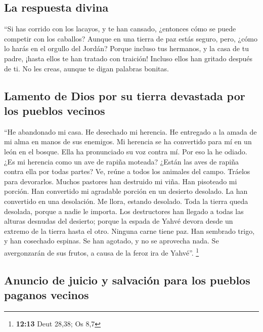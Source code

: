 \begin{paracol}{2}
\hypertarget{la-respuesta-divina}{%
\subsection{La respuesta divina}\label{la-respuesta-divina}}

 ``Si has corrido con los lacayos, y te han cansado,
¿entonces cómo se puede competir con los caballos? Aunque en una tierra
de paz estás seguro, pero, ¿cómo lo harás en el orgullo del Jordán?
 Porque incluso tus hermanos, y la casa de tu padre,
¡hasta ellos te han tratado con traición! Incluso ellos han gritado
después de ti. No les creas, aunque te digan palabras bonitas.

\hypertarget{lamento-de-dios-por-su-tierra-devastada-por-los-pueblos-vecinos}{%
\subsection{Lamento de Dios por su tierra devastada por los pueblos
vecinos}\label{lamento-de-dios-por-su-tierra-devastada-por-los-pueblos-vecinos}}

 ``He abandonado mi casa. He desechado mi herencia. He
entregado a la amada de mi alma en manos de sus enemigos. 
Mi herencia se ha convertido para mí en un león en el bosque. Ella ha
pronunciado su voz contra mí. Por eso la he odiado.  ¿Es
mi herencia como un ave de rapiña moteada? ¿Están las aves de rapiña
contra ella por todas partes? Ve, reúne a todos los animales del campo.
Tráelos para devorarlos.  Muchos pastores han destruido
mi viña. Han pisoteado mi porción. Han convertido mi agradable porción
en un desierto desolado.  La han convertido en una
desolación. Me llora, estando desolado. Toda la tierra queda desolada,
porque a nadie le importa.  Los destructores han llegado
a todas las alturas desnudas del desierto; porque la espada de Yahvé
devora desde un extremo de la tierra hasta el otro. Ninguna carne tiene
paz.  Han sembrado trigo, y han cosechado espinas. Se han
agotado, y no se aprovecha nada. Se avergonzarán de sus frutos, a causa
de la feroz ira de Yahvé''. \footnote{\textbf{12:13} Deut 28,38; Os 8,7}

\hypertarget{anuncio-de-juicio-y-salvaciuxf3n-para-los-pueblos-paganos-vecinos}{%
\subsection{Anuncio de juicio y salvación para los pueblos paganos
vecinos}\label{anuncio-de-juicio-y-salvaciuxf3n-para-los-pueblos-paganos-vecinos}}


\end{paracol}
